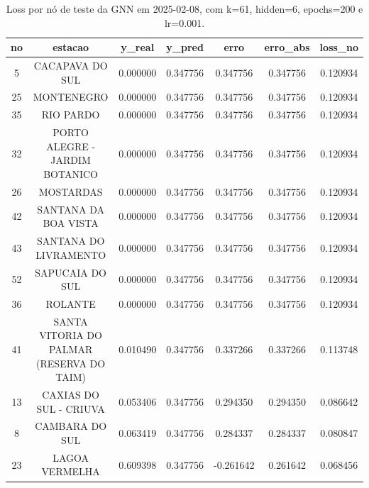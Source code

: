 \begin{table}[h]
\centering
\caption{Loss por nó de teste da GNN em 2025-02-08, com k=61, hidden=6, epochs=200 e lr=0.001.}
\label{tab:gnn_loss_nodes_k61_hidden6}
\begin{tabular}{ccccccc}
\toprule
no & estacao & y\_real & y\_pred & erro & erro\_abs & loss\_no \\
\midrule
5 & CACAPAVA DO SUL & 0.000000 & 0.347756 & 0.347756 & 0.347756 & 0.120934 \\
25 & MONTENEGRO & 0.000000 & 0.347756 & 0.347756 & 0.347756 & 0.120934 \\
35 & RIO PARDO & 0.000000 & 0.347756 & 0.347756 & 0.347756 & 0.120934 \\
32 & PORTO ALEGRE - JARDIM BOTANICO & 0.000000 & 0.347756 & 0.347756 & 0.347756 & 0.120934 \\
26 & MOSTARDAS & 0.000000 & 0.347756 & 0.347756 & 0.347756 & 0.120934 \\
42 & SANTANA DA BOA VISTA & 0.000000 & 0.347756 & 0.347756 & 0.347756 & 0.120934 \\
43 & SANTANA DO LIVRAMENTO & 0.000000 & 0.347756 & 0.347756 & 0.347756 & 0.120934 \\
52 & SAPUCAIA DO SUL & 0.000000 & 0.347756 & 0.347756 & 0.347756 & 0.120934 \\
36 & ROLANTE & 0.000000 & 0.347756 & 0.347756 & 0.347756 & 0.120934 \\
41 & SANTA VITORIA DO PALMAR (RESERVA DO TAIM) & 0.010490 & 0.347756 & 0.337266 & 0.337266 & 0.113748 \\
13 & CAXIAS DO SUL - CRIUVA & 0.053406 & 0.347756 & 0.294350 & 0.294350 & 0.086642 \\
8 & CAMBARA DO SUL & 0.063419 & 0.347756 & 0.284337 & 0.284337 & 0.080847 \\
23 & LAGOA VERMELHA & 0.609398 & 0.347756 & -0.261642 & 0.261642 & 0.068456 \\
\bottomrule
\end{tabular}
\end{table}
